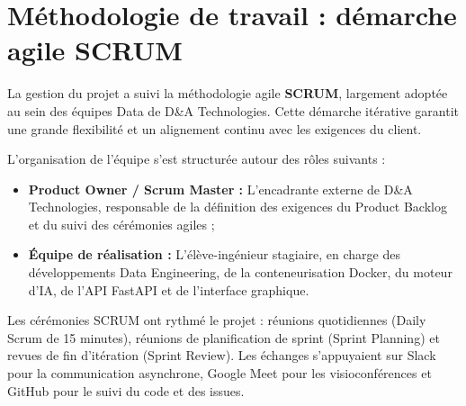 \documentclass[a4paper,12pt]{report}
\begin{document}
\section{Méthodologie de travail : démarche agile SCRUM}
\begin{doublespace}
La gestion du projet a suivi la méthodologie agile \textbf{SCRUM}, largement adoptée au sein des équipes Data de D\&A Technologies. Cette démarche itérative garantit une grande flexibilité et un alignement continu avec les exigences du client.

\noindent L'organisation de l'équipe s'est structurée autour des rôles suivants :
\begin{itemize}
    \item \textbf{Product Owner / Scrum Master :} L'encadrante externe de D\&A Technologies, responsable de la définition des exigences du Product Backlog et du suivi des cérémonies agiles ;
    \item \textbf{Équipe de réalisation :} L'élève-ingénieur stagiaire, en charge des développements Data Engineering, de la conteneurisation Docker, du moteur d'IA, de l'API FastAPI et de l'interface graphique.
\end{itemize}

\noindent Les cérémonies SCRUM ont rythmé le projet : réunions quotidiennes (Daily Scrum de 15 minutes), réunions de planification de sprint (Sprint Planning) et revues de fin d'itération (Sprint Review). Les échanges s'appuyaient sur Slack pour la communication asynchrone, Google Meet pour les visioconférences et GitHub pour le suivi du code et des issues.


\end{doublespace}
\end{document}
